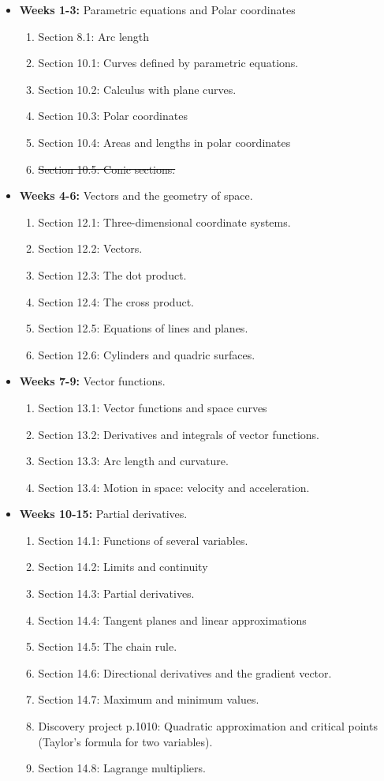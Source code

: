 \documentclass[10pt]{article}
\theoremstyle{definition}
\newcommand{\1}[1]{\textbf{1}_{\left[#1\right]}} %
\begin{document}
\begin{itemize}
  \item \textbf{Weeks 1-3:} Parametric equations and Polar coordinates
  \begin{enumerate}
    \item Section 8.1: Arc length
    \item Section 10.1: Curves defined by parametric equations.
    \item Section 10.2: Calculus with plane curves.
    \item Section 10.3: Polar coordinates
    \item Section 10.4: Areas and lengths in polar coordinates
    \item \sout{Section 10.5: Conic sections.}
  \end{enumerate}
  \item \textbf{Weeks 4-6:} Vectors and the geometry of space.
  \begin{enumerate}
    \item Section 12.1: Three-dimensional coordinate systems.
    \item Section 12.2: Vectors.
    \item Section 12.3: The dot product.
    \item Section 12.4: The cross product.
    \item Section 12.5: Equations of lines and planes.
    \item Section 12.6: Cylinders and quadric surfaces.
  \end{enumerate}
  \item \textbf{Weeks 7-9:} Vector functions.
  \begin{enumerate}
    \item Section 13.1: Vector functions and space curves
    \item Section 13.2: Derivatives and integrals of vector functions.
    \item Section 13.3: Arc length and curvature.
    \item Section 13.4: Motion in space: velocity and acceleration.
  \end{enumerate}
  \item \textbf{Weeks 10-15:} Partial derivatives.
  \begin{enumerate}
    \item Section 14.1: Functions of several variables.
    \item Section 14.2: Limits and continuity
    \item Section 14.3: Partial derivatives.
    \item Section 14.4: Tangent planes and linear approximations
    \item Section 14.5: The chain rule.
    \item Section 14.6: Directional derivatives and the gradient vector.
    \item Section 14.7: Maximum and minimum values.
    \item Discovery project p.1010: Quadratic approximation and critical
    points (Taylor’s formula for two variables).
    \item Section 14.8: Lagrange multipliers.
  \end{enumerate}
\end{itemize} 
\end{document}
